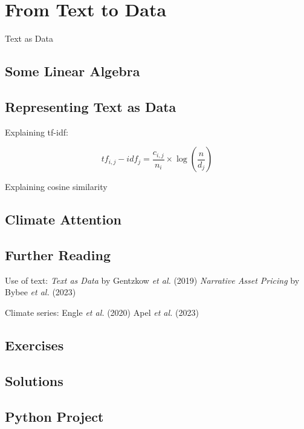 \chapter{From Text to Data}


 Text as Data

\section{Some Linear Algebra}

\section{Representing Text as Data}

 Explaining tf-idf:

\begin{equation}
tf_{i,j} - idf_{j} = \frac{c_{i,j}}{n_i} \times \log (\frac{n}{d_j})
\end{equation}


Explaining cosine similarity




\section{Climate Attention}


\section{Further Reading}
Use of text:
\textit{Text as Data} by Gentzkow \textit{et al.} (2019) \cite{gentzkow2019text}
\textit{Narrative Asset Pricing} by Bybee \textit{et al.} (2023) \cite{bybee2023narrative}

Climate series:
Engle \textit{et al.} (2020) \cite{engle2020hedging}
Apel \textit{et al.} (2023) \cite{apel2023real}
\section{Exercises}

\section{Solutions}

\section{Python Project}

